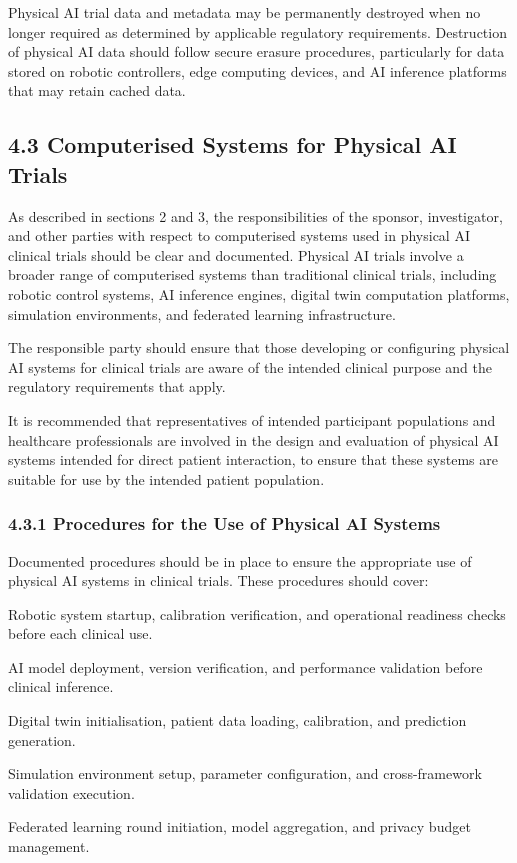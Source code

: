 Physical AI trial data and metadata may be permanently destroyed when no longer required as determined by applicable regulatory requirements. Destruction of physical AI data should follow secure erasure procedures, particularly for data stored on robotic controllers, edge computing devices, and AI inference platforms that may retain cached data.

\subsection{4.3 Computerised Systems for Physical AI Trials}

As described in sections 2 and 3, the responsibilities of the sponsor, investigator, and other parties with respect to computerised systems used in physical AI clinical trials should be clear and documented. Physical AI trials involve a broader range of computerised systems than traditional clinical trials, including robotic control systems, AI inference engines, digital twin computation platforms, simulation environments, and federated learning infrastructure.

The responsible party should ensure that those developing or configuring physical AI systems for clinical trials are aware of the intended clinical purpose and the regulatory requirements that apply.

It is recommended that representatives of intended participant populations and healthcare professionals are involved in the design and evaluation of physical AI systems intended for direct patient interaction, to ensure that these systems are suitable for use by the intended patient population.

\subsubsection{4.3.1 Procedures for the Use of Physical AI Systems}

Documented procedures should be in place to ensure the appropriate use of physical AI systems in clinical trials. These procedures should cover:

\begin{description}[leftmargin=2.5cm,style=sameline]

\item[(a)] Robotic system startup, calibration verification, and operational readiness checks before each clinical use.

\item[(b)] AI model deployment, version verification, and performance validation before clinical inference.

\item[(c)] Digital twin initialisation, patient data loading, calibration, and prediction generation.

\item[(d)] Simulation environment setup, parameter configuration, and cross-framework validation execution.

\item[(e)] Federated learning round initiation, model aggregation, and privacy budget management.

\end{description}

